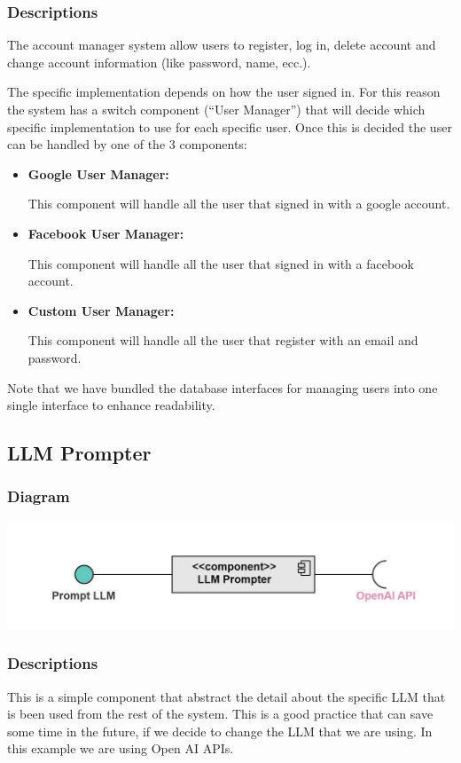 \documentclass{article}
\begin{document}
\subsubsection{Descriptions}
The account manager system allow users to register, log in, delete account and change account information (like password, name, ecc.).

The specific implementation depends on how the user signed in. For this reason the system has a switch component (``User Manager'')
that will decide which specific implementation to use for each specific user. Once this is decided the user
can be handled by one of the 3 components:
\begin{itemize}
    \item \textbf{Google User Manager: }

          This component will handle all the user that signed in with a google account.
    \item \textbf{Facebook User Manager: }

          This component will handle all the user that signed in with a facebook account.
    \item \textbf{Custom User Manager: }

          This component will handle all the user that register with an email and password.
\end{itemize}
Note that we have bundled the database interfaces for managing users into one single interface to enhance readability.
\subsection{LLM Prompter}
\subsubsection{Diagram}
\includegraphics[width=\textwidth,height=\textheight,keepaspectratio]{images/component_diagram/llm_prompter.jpg}
\subsubsection{Descriptions}
This is a simple component that abstract the detail about the specific LLM that is been used from the rest of the system.
This is a good practice that can save some time in the future, if we decide to change the LLM that we are using.
In this example we are using Open AI APIs.
\end{document}
